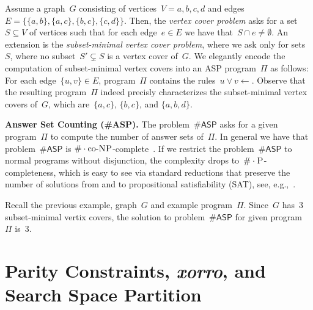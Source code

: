 \documentclass{svproc}
\def\asp{\textsf{\#ASP}\xspace}
\def\SAT{\textsf{SAT}\xspace}
\renewcommand{\P}{\ensuremath{\textsc{P}}\xspace}
\newcommand{\coNP}{\ensuremath{\text{co-}\textsc{NP}}\xspace}
\newcommand{\cnt}[0]{\ensuremath{\#}}
\newcommand{\cntc}[0]{\ensuremath{\cnt\cdot}}
\begin{document}

\begin{example}
Assume a graph~$G$ consisting of vertices~$V=a,b,c,d$
and edges~$E=\{\{a,b\}, \{a,c\}, \{b,c\}, \{c,d\}\}$.
Then, the \emph{vertex cover problem} asks for a set~$S\subseteq V$ of vertices
such that for each edge~$e\in E$ we have that~$S\cap e\neq \emptyset$.
An extension is the \emph{subset-minimal vertex cover problem}, where we ask
only for sets~$S$, where no subset~$S'\subsetneq S$ is a vertex cover of~$G$.
We elegantly encode the computation of subset-minimal vertex covers into an ASP program~$\Pi$ as follows:
For each edge~$\{u,v\}\in E$, program~$\Pi$ contains the rules~$u \vee v \leftarrow$.
Observe that the resulting program~$\Pi$ indeed precisly characterizes the subset-minimal vertex covers of~$G$, which are~$\{a,c\}$, $\{b,c\}$, and $\{a,b,d\}$.
\end{example}

\noindent\textbf{Answer Set Counting (\asp).}
The problem~$\asp$ asks for a given program~$\Pi$ to compute the number of
answer sets of~$\Pi$.
In general we have that problem~$\asp$ is
$\cntc\coNP$-complete~\cite{FichteEtAl17}.
If we restrict the problem~$\asp$ to normal programs without disjunction,
the complexity drops to~$\cntc\P$-completeness,
which is easy to see via standard reductions
that preserve the number of solutions from and to propositional satisfiability (\SAT), see, e.g.,~\cite{Janhunen06}.

\begin{example}
Recall the previous example, graph~$G$ and example program~$\Pi$.
Since~$G$ has~$3$ subset-minimal vertix covers, the solution to problem~$\asp$
for given program~$\Pi$ is~$3$.
\end{example}


\section{Parity Constraints, \emph{xorro}, and Search Space Partition} \label{sec:parity}
\end{document}
